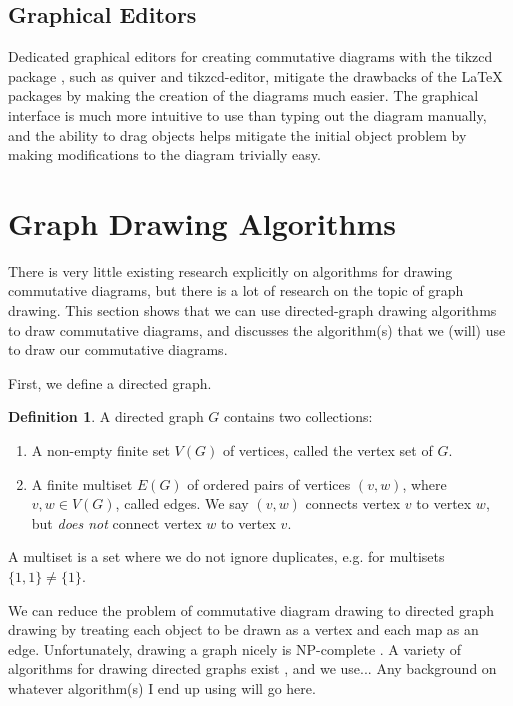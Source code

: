\documentclass[logo,bsc,singlespacing,parskip]{infthesis}
\theoremstyle{definition}
\newtheorem{defn}[prop]{Definition}
\begin{document}
\subsection{Graphical Editors}
Dedicated graphical editors for creating commutative diagrams with the tikzcd package \cite{Stoffel_2021}, such as quiver \cite{Arkor_quiver_2023} and tikzcd-editor, \cite{shen_tikzcd-editor_2023} mitigate the drawbacks of the \LaTeX{} packages by making the creation of the diagrams much easier. The graphical interface is much more intuitive to use than typing out the diagram manually, and the ability to drag objects helps mitigate the initial object problem by making modifications to the diagram trivially easy. 

\section{Graph Drawing Algorithms}\label{bkg:graph-draw}
There is very little existing research explicitly on algorithms for drawing commutative diagrams, but there is a lot of research on the topic of graph drawing. This section shows that we can use directed-graph drawing algorithms to draw commutative diagrams, and discusses the algorithm(s) that we (will) use to draw our commutative diagrams.

First, we define a directed graph.
\begin{defn}
    A directed graph $G$ contains two collections:
    \begin{enumerate}
        \item A non-empty finite set $V(G)$ of vertices, called the vertex set of $G$.
        \item A finite multiset $E(G)$ of ordered pairs of vertices $(v,w)$, where $v, w \in V(G)$, called edges. We say $(v,w)$ connects vertex $v$ to vertex $w$, but \emph{does not} connect vertex $w$ to vertex $v$.
    \end{enumerate}
\end{defn}
 A multiset is a set where we do not ignore duplicates, e.g. for multisets $\{1, 1\} \ne \{1\}$.

We can reduce the problem of commutative diagram drawing to directed graph drawing by treating each object to be drawn as a vertex and each map as an edge.
Unfortunately, drawing a graph nicely is NP-complete \cite{10.1007/3-540-52698-6_1}. A variety of algorithms for drawing directed graphs exist \cite{di1994algorithms}, and we use... Any background on whatever algorithm(s) I end up using will go here.
\end{document}
